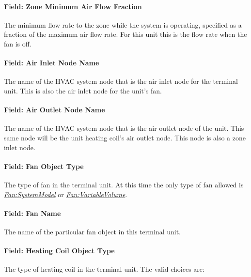 \paragraph{Field: Zone Minimum Air Flow Fraction}\label{field-zone-minimum-air-flow-fraction}

The minimum flow rate to the zone while the system is operating, specified as a fraction of the maximum air flow rate. For this unit this is the flow rate when the fan is off.

\paragraph{Field: Air Inlet Node Name}\label{field-air-inlet-node-name-2}

The name of the HVAC system node that is the air inlet node for the terminal unit. This is also the air inlet node for the unit's fan.

\paragraph{Field: Air Outlet Node Name}\label{field-air-outlet-node-name-2}

The name of the HVAC system node that is the air outlet node of the unit. This same node will be the unit heating coil's air outlet node. This node is also a zone inlet node.

\paragraph{Field: Fan Object Type}\label{field-fan-object-type}

The type of fan in the terminal unit. At this time the only type of fan allowed is \emph{\hyperref[fansystemmodel]{Fan:SystemModel}} or \emph{\hyperref[fanvariablevolume]{Fan:VariableVolume}}.

\paragraph{Field: Fan Name}\label{field-fan-name}

The name of the particular fan object in this terminal unit.

\paragraph{Field: Heating Coil Object Type}\label{field-heating-coil-object-type}

The type of heating coil in the terminal unit. The valid choices are:

